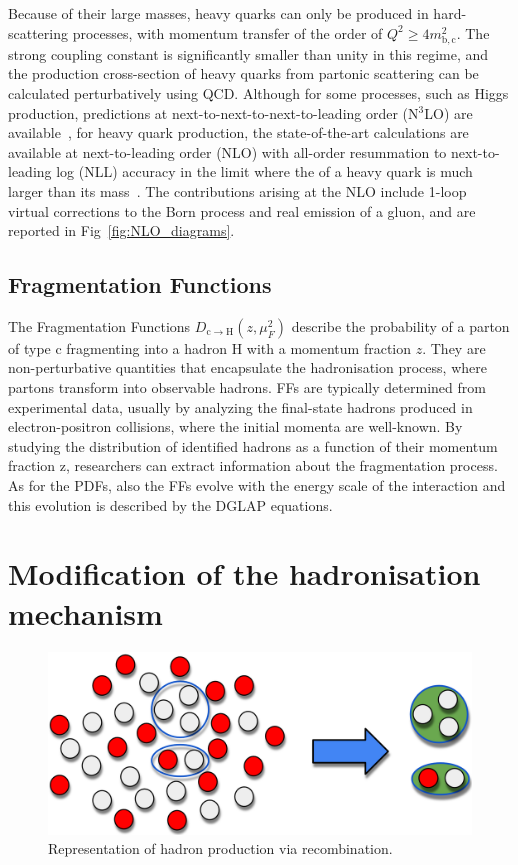 Because of their large masses, heavy quarks can only be produced in hard-scattering processes, with momentum transfer of the order of $Q^2 \geq 4m^2_\mathrm{b,c}$. The strong coupling constant is significantly smaller than unity in this regime, and the production cross-section of heavy quarks from partonic scattering can be calculated perturbatively using QCD. Although for some processes, such as Higgs production, predictions at next-to-next-to-next-to-leading order (N$^3$LO) are available~\cite{Anastasiou:2015vya, Anastasiou:2016cez}, for heavy quark production, the state-of-the-art calculations are available at next-to-leading order (NLO) with all-order resummation to next-to-leading log (NLL) accuracy in the limit where the \pt of a heavy quark is much larger than its mass~\cite{Cacciari:1998it}. The contributions arising at the NLO include 1-loop virtual corrections to the Born process and real emission of a gluon, and are reported in Fig~\ref{fig:NLO_diagrams}.

\subsection{Fragmentation Functions}
The Fragmentation Functions $D_\mathrm{c\rightarrow H}(z,\mu_F^2)$ describe the probability of a parton of type c fragmenting into a hadron H with a momentum fraction $z$. They are non-perturbative quantities that encapsulate the hadronisation process, where partons transform into observable hadrons. FFs are typically determined from experimental data, usually by analyzing the final-state hadrons produced in electron-positron collisions, where the initial momenta are well-known. By studying the distribution of identified hadrons as a function of their momentum fraction z, researchers can extract information about the fragmentation process. As for the PDFs, also the FFs evolve with the energy scale of the interaction and this evolution is described by the DGLAP equations.

\section{Modification of the hadronisation mechanism}
\begin{figure}[htb]
    \centering
    \includegraphics[width=0.7\linewidth]{Figures/Chapter 2/Coalescence.png}
    \caption{Representation of hadron production via recombination.}
\end{figure}

